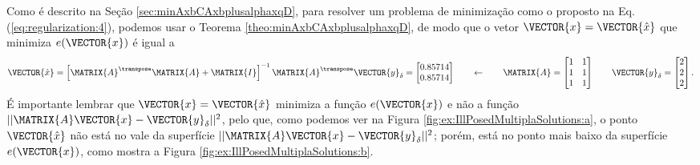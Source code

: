 \begin{SolutionT}
\label{sol:IllPosedMultiplaSolutions}
Como é descrito na Seção \ref{sec:minAxbCAxbplusalphaxqD}, 
para resolver um problema de minimização como o proposto na Eq. (\ref{eq:regularization:4}),
podemos usar o Teorema \ref{theo:minAxbCAxbplusalphaxqD}, 
de modo que o vetor $\VECTOR{x}=\VECTOR{\hat{x}}$ que minimiza $e(\VECTOR{x})$
é igual a
\begin{equation}\label{eq:regularization:4b}
\VECTOR{\hat{x}} =
\left[ \MATRIX{A}^{\transpose}\MATRIX{A} +\MATRIX{I}\right]^{-1} \MATRIX{A}^{\transpose} \VECTOR{y}_{\delta}
=
\begin{bmatrix}
0.85714\\
0.85714
\end{bmatrix}
\qquad \leftarrow \qquad
\MATRIX{A}=
\begin{bmatrix}
1 & 1\\
1 & 1\\
1 & 1
\end{bmatrix}
\qquad
\VECTOR{y}_{\delta}=
\begin{bmatrix}
2\\
2\\
2
\end{bmatrix}.
\end{equation}
É importante lembrar que $\VECTOR{x}=\VECTOR{\hat{x}}$ minimiza a função $e(\VECTOR{x})$ e não
a função $||\MATRIX{A}\VECTOR{x}-\VECTOR{y}_{\delta}||^2$,
pelo que, como podemos ver na Figura \ref{fig:ex:IllPosedMultiplaSolutions:a},
o ponto $\VECTOR{\hat{x}}$ não está no vale da superfície $||\MATRIX{A}\VECTOR{x}-\VECTOR{y}_{\delta}||^2$;
porém, está no ponto mais baixo da superfície $e(\VECTOR{x})$, 
como mostra a Figura \ref{fig:ex:IllPosedMultiplaSolutions:b}.
\end{SolutionT}

